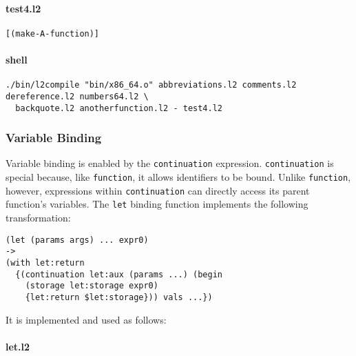 \documentclass[]{article}
\let\oldparagraph\paragraph
\renewcommand{\paragraph}[1]{\oldparagraph{#1}\mbox{}}
\begin{document}
\paragraph{test4.l2}\label{test4.l2}

\begin{verbatim}
[(make-A-function)]
\end{verbatim}

\paragraph{shell}\label{shell-3}

\begin{verbatim}
./bin/l2compile "bin/x86_64.o" abbreviations.l2 comments.l2 dereference.l2 numbers64.l2 \
  backquote.l2 anotherfunction.l2 - test4.l2
\end{verbatim}

\hypertarget{variable-binding}{\subsubsection{Variable
Binding}\label{variable-binding}}

Variable binding is enabled by the \texttt{continuation} expression.
\texttt{continuation} is special because, like \texttt{function}, it
allows identifiers to be bound. Unlike \texttt{function}, however,
expressions within \texttt{continuation} can directly access its parent
function's variables. The \texttt{let} binding function implements the
following transformation:

\begin{verbatim}
(let (params args) ... expr0)
->
(with let:return
  {(continuation let:aux (params ...) (begin
    (storage let:storage expr0)
    {let:return $let:storage})) vals ...})
\end{verbatim}

It is implemented and used as follows:

\paragraph{let.l2}\label{let.l2}
\end{document}

